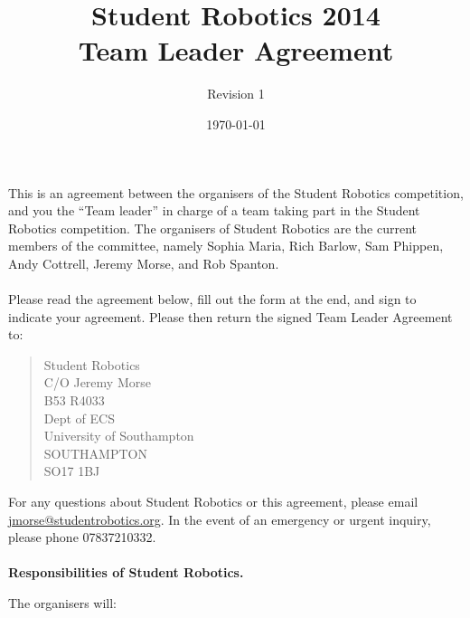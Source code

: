 \documentclass[a4paper, 11pt]{scrartcl}
\title {Student Robotics 2014\\ Team Leader Agreement}
\author{Revision 1}
\date{\today}
\begin{document}
\maketitle

This is an agreement between the organisers of the Student Robotics
competition, and you the ``Team leader'' in charge of a team taking part
in the Student Robotics competition. The organisers of Student Robotics are
the current members of the committee, namely Sophia Maria, Rich Barlow,
Sam Phippen, Andy Cottrell, Jeremy Morse, and Rob Spanton.

\paragraph{}

Please read the agreement below, fill out the form at the end, and sign to
indicate your agreement. Please then return the signed Team Leader Agreement to:
\begin{quote}
	Student Robotics \\
	C/O Jeremy Morse \\
	B53 R4033 \\
	Dept of ECS \\
	University of Southampton \\
	SOUTHAMPTON \\
	SO17 1BJ
\end{quote}

For any questions about Student Robotics or this agreement, please email
\url{jmorse@studentrobotics.org}. In the event of an emergency or urgent
inquiry, please phone 07837210332.

\paragraph{}

\textbf{Responsibilities of Student Robotics.}

The organisers will:
\end{document}
